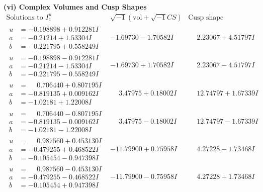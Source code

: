 \documentclass[1p]{elsarticle_modified}
\theoremstyle{definition}
\newcommand{\I}{\sqrt{-1}}
\begin{document}
\newpage\flushleft \textbf{(vi) Complex Volumes and Cusp Shapes}
$$\begin{array}{c|c|c}  
\text{Solutions to }I^u_{1}& \I (\text{vol} + \sqrt{-1}CS) & \text{Cusp shape}\\
 \hline 
\begin{aligned}
u &= -0.198898 + 0.912281 I \\
a &= -0.21214 + 1.53304 I \\
b &= -0.221795 + 0.558249 I\end{aligned}
 & -1.69730 - 1.70582 I & \phantom{-}2.23067 + 4.51797 I \\ \hline\begin{aligned}
u &= -0.198898 - 0.912281 I \\
a &= -0.21214 - 1.53304 I \\
b &= -0.221795 - 0.558249 I\end{aligned}
 & -1.69730 + 1.70582 I & \phantom{-}2.23067 - 4.51797 I \\ \hline\begin{aligned}
u &= \phantom{-}0.706440 + 0.807195 I \\
a &= -0.819135 + 0.009162 I \\
b &= -1.02181 + 1.22008 I\end{aligned}
 & \phantom{-}3.47975 + 0.18002 I & \phantom{-}12.74797 + 1.67339 I \\ \hline\begin{aligned}
u &= \phantom{-}0.706440 - 0.807195 I \\
a &= -0.819135 - 0.009162 I \\
b &= -1.02181 - 1.22008 I\end{aligned}
 & \phantom{-}3.47975 - 0.18002 I & \phantom{-}12.74797 - 1.67339 I \\ \hline\begin{aligned}
u &= \phantom{-}0.987560 + 0.453130 I \\
a &= -0.479255 + 0.468522 I \\
b &= -0.105454 - 0.947398 I\end{aligned}
 & -11.79900 + 0.75958 I & \phantom{-}4.27228 - 1.73468 I \\ \hline\begin{aligned}
u &= \phantom{-}0.987560 - 0.453130 I \\
a &= -0.479255 - 0.468522 I \\
b &= -0.105454 + 0.947398 I\end{aligned}
 & -11.79900 - 0.75958 I & \phantom{-}4.27228 + 1.73468 I \\ \hline\begin{aligned}

\end{aligned}
\end{array}$$
\end{document}
